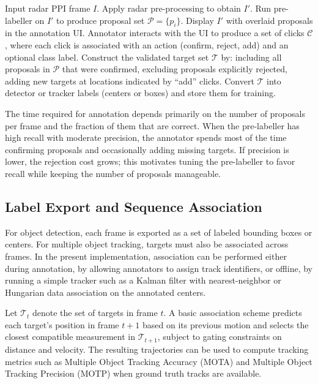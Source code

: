\documentclass[twocolumn, 10pt]{article}
\begin{document}
\begin{algorithm}[t]
\caption{Pre-labelling and click-to-annotate for one PPI frame}
\label{alg:pipeline}
\begin{algorithmic}[1]
\STATE Input radar PPI frame $I$.
\STATE Apply radar pre-processing to obtain $I'$.
\STATE Run pre-labeller on $I'$ to produce proposal set $\mathcal{P} = \{p_i\}$.
\STATE Display $I'$ with overlaid proposals in the annotation UI.
\STATE Annotator interacts with the UI to produce a set of clicks $\mathcal{C}$, where each click is associated with an action (confirm, reject, add) and an optional class label.
\STATE Construct the validated target set $\mathcal{T}$ by:
\STATE \hspace{0.5cm} including all proposals in $\mathcal{P}$ that were confirmed,
\STATE \hspace{0.5cm} excluding proposals explicitly rejected,
\STATE \hspace{0.5cm} adding new targets at locations indicated by ``add'' clicks.
\STATE Convert $\mathcal{T}$ into detector or tracker labels (centers or boxes) and store them for training.
\end{algorithmic}
\end{algorithm}

The time required for annotation depends primarily on the number of proposals per frame and the fraction of them that are correct. When the pre-labeller has high recall with moderate precision, the annotator spends most of the time confirming proposals and occasionally adding missing targets. If precision is lower, the rejection cost grows; this motivates tuning the pre-labeller to favor recall while keeping the number of proposals manageable.

\subsection{Label Export and Sequence Association}

For object detection, each frame is exported as a set of labeled bounding boxes or centers. For multiple object tracking, targets must also be associated across frames. In the present implementation, association can be performed either during annotation, by allowing annotators to assign track identifiers, or offline, by running a simple tracker such as a Kalman filter with nearest-neighbor or Hungarian data association on the annotated centers.

Let $\mathcal{T}_t$ denote the set of targets in frame $t$. A basic association scheme predicts each target’s position in frame $t+1$ based on its previous motion and selects the closest compatible measurement in $\mathcal{T}_{t+1}$, subject to gating constraints on distance and velocity. The resulting trajectories can be used to compute tracking metrics such as Multiple Object Tracking Accuracy (MOTA) and Multiple Object Tracking Precision (MOTP) when ground truth tracks are available.
\end{document}
